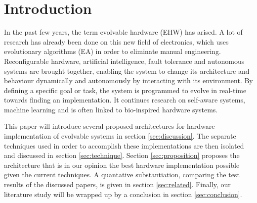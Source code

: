 
\section{Introduction}

In the past few years, the term evolvable hardware (EHW) has arised. A lot of research has already been done on this new field of electronics, which uses evolutionary algorithms (EA) in order to eliminate manual engineering. Reconfigurable hardware, artificial intelligence, fault tolerance and autonomous systems are brought together, enabling the system to change its architecture and behaviour dynamically and autonomously by interacting with its environment. By defining a specific goal or task, the system is programmed to evolve in real-time towards finding an implementation. It continues research on self-aware systems, machine learning and is often linked to bio-inspired hardware systems. 

This paper will introduce several proposed architectures for hardware implementation of evolvable systems in section \ref{sec:discussion}. The separate techniques used in order to accomplish these implementations are then isolated and discussed in section \ref{sec:technique}. Section \ref{sec:proposition} proposes the architecture that is in our opinion the best hardware implementation possible given the current techniques. A quantative substantiation, comparing the test results of the discussed papers, is given in section \ref{sec:related}. Finally, our literature study will be wrapped up by a conclusion in section \ref{sec:conclusion}.